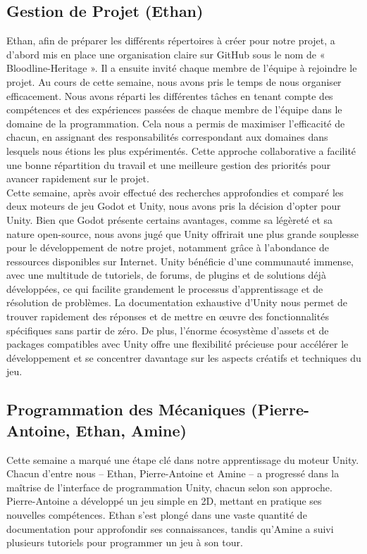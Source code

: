 \documentclass{report}
\begin{document}
\subsection*{Gestion de Projet (Ethan)}
Ethan, afin de préparer les différents répertoires à créer pour notre projet, a d'abord mis en place une organisation claire sur GitHub sous le nom de « Bloodline-Heritage ». Il a ensuite invité chaque membre de l'équipe à rejoindre le projet. Au cours de cette semaine, nous avons pris le temps de nous organiser efficacement. Nous avons réparti les différentes tâches en tenant compte des compétences et des expériences passées de chaque membre de l'équipe dans le domaine de la programmation. Cela nous a permis de maximiser l'efficacité de chacun, en assignant des responsabilités correspondant aux domaines dans lesquels nous étions les plus expérimentés. Cette approche collaborative a facilité une bonne répartition du travail et une meilleure gestion des priorités pour avancer rapidement sur le projet.
\\[0.4cm]
Cette semaine, après avoir effectué des recherches approfondies et comparé les deux moteurs de jeu Godot et Unity, nous avons pris la décision d'opter pour Unity. Bien que Godot présente certains avantages, comme sa légèreté et sa nature open-source, nous avons jugé que Unity offrirait une plus grande souplesse pour le développement de notre projet, notamment grâce à l'abondance de ressources disponibles sur Internet. Unity bénéficie d'une communauté immense, avec une multitude de tutoriels, de forums, de plugins et de solutions déjà développées, ce qui facilite grandement le processus d'apprentissage et de résolution de problèmes. La documentation exhaustive d'Unity nous permet de trouver rapidement des réponses et de mettre en œuvre des fonctionnalités spécifiques sans partir de zéro. De plus, l'énorme écosystème d'assets et de packages compatibles avec Unity offre une flexibilité précieuse pour accélérer le développement et se concentrer davantage sur les aspects créatifs et techniques du jeu.

\subsection*{Programmation des Mécaniques (Pierre-Antoine, Ethan, Amine)}
Cette semaine a marqué une étape clé dans notre apprentissage du moteur Unity. Chacun d'entre nous – Ethan, Pierre-Antoine et Amine – a progressé dans la maîtrise de l'interface de programmation Unity, chacun selon son approche. Pierre-Antoine a développé un jeu simple en 2D, mettant en pratique ses nouvelles compétences. Ethan s'est plongé dans une vaste quantité de documentation pour approfondir ses connaissances, tandis qu'Amine a suivi plusieurs tutoriels pour programmer un jeu à son tour. 
\end{document}

